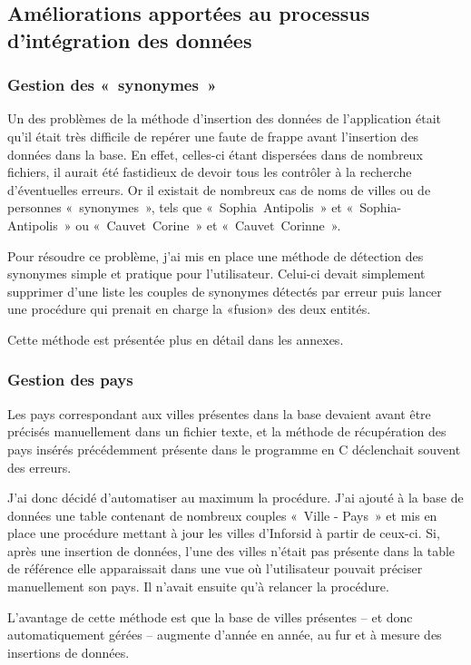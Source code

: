	
			\subsection{Améliorations apportées au processus d'intégration des données}			
		
		\subsubsection{Gestion des «~synonymes~»}
			Un des problèmes de la méthode d\rq{}insertion des données de l\rq{}application était qu\rq{}il était très difficile de repérer une faute de frappe avant l\rq{}insertion des données dans la base. En effet, celles-ci étant dispersées dans de nombreux fichiers, il aurait été fastidieux de devoir tous les contrôler à la recherche d\rq{}éventuelles erreurs. Or il existait de nombreux cas de noms de villes ou de personnes «~synonymes~», tels que «~Sophia~Antipolis~» et «~Sophia-Antipolis~» ou «~Cauvet~Corine~» et «~Cauvet~Corinne~».
			
			Pour résoudre ce problème, j\rq{}ai mis en place une méthode de détection des synonymes simple et pratique pour l'utilisateur. Celui-ci devait simplement supprimer d'une liste les couples de synonymes détectés par erreur puis lancer une procédure qui prenait en charge la «fusion» des deux entités.
			
			Cette méthode est présentée plus en détail dans les annexes.
			 
			 
		\subsubsection{Gestion des pays}
			Les pays correspondant aux villes présentes dans la base devaient avant être précisés manuellement dans un fichier texte, et la méthode de récupération des pays insérés précédemment présente dans le programme en C déclenchait souvent des erreurs.
			
			J'ai donc décidé d\rq{}automatiser au maximum la procédure. J'ai ajouté à la base de données une table contenant de nombreux couples «~Ville - Pays~» et mis en place une procédure mettant à jour les villes d'Inforsid à partir de ceux-ci. Si, après une insertion de données, l'une des villes n'était pas présente dans la table de référence elle apparaissait dans une vue où l'utilisateur pouvait préciser manuellement son pays. Il n'avait ensuite qu'à relancer la procédure.
			
			L\rq{}avantage de cette méthode est que la base de villes présentes  -- et donc automatiquement gérées -- augmente d\rq{}année en année, au fur et à mesure des insertions de données.
	


